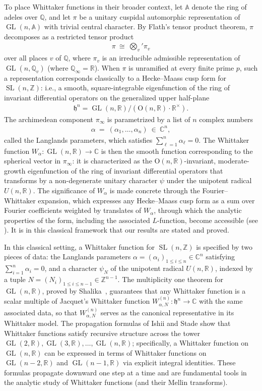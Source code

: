 \documentclass[12pt, reqno, oneside]{amsart}
\theoremstyle{definition}
\numberwithin{equation}{section}
\newcommand{\Z}{\mathbb{Z}}
\newcommand{\R}{\mathbb{R}}
\newcommand{\C}{\mathbb{C}}
\newcommand{\A}{\mathbb{A}}
\newcommand{\Q}{\mathbb{Q}}
\newcommand{\hh}{\mathfrak{h}}
\DeclareMathOperator{\GL}{GL}
\DeclareMathOperator{\SL}{SL}
\begin{document}
To place Whittaker functions in their broader context, let $\A$ denote
the ring of adeles over $\Q$, and let $\pi$ be a unitary cuspidal automorphic
representation of $\GL(n,\A)$ with trivial central character. By
Flath's tensor product theorem, $\pi$ decomposes as a restricted tensor product 
\begin{align*}
\pi \ \cong \ \bigotimes_v' \pi_v
\end{align*}
over all places $v$ of $\Q$,
where $\pi_v$ is an irreducible admissible representation of
$\GL(n,\Q_v)$ (where $\Q_\infty = \R$). When $\pi$ is unramified at every finite prime $p$, such a representation corresponds classically to a Hecke--Maass cusp form for $\SL(n,\Z)$: i.e., a smooth,
square-integrable eigenfunction of the ring of
invariant differential operators on the generalized upper half-plane
\begin{align*}
\hh^n = \GL(n,\R)/(\mathrm{O}(n,\R)\cdot\R^\times).
\end{align*}
The archimedean
component $\pi_\infty$ is parametrized by a list of $n$ complex numbers
\begin{align*}
\alpha \ = \ (\alpha_1, \dots, \alpha_n) \ \in \ \C^n,
\end{align*}
called the Langlands parameters, which satisfies $\sum_{\ell = 1}^n \alpha_\ell = 0$. The Whittaker function $W_\alpha :
\GL(n,\R)\to\C$ is then the smooth function corresponding to the
spherical vector in $\pi_\infty$: it is characterized as the
$\mathrm{O}(n,\R)$-invariant, moderate-growth eigenfunction of the ring of invariant differential operators that transforms by a non-degenerate unitary character $\psi$ under the
unipotent radical $U(n,\R)$. The significance of $W_\alpha$ is made concrete
through the Fourier--Whittaker expansion, which expresses any Hecke--Maass
cusp form as a sum over Fourier coefficients weighted by translates of
$W_\alpha$, through which the analytic properties of the form, including
the associated $L$-function, become accessible (see \cite[Theorem 9.3.11]{Gol06}). It is in this classical
framework that our
results are stated and proved.

In this classical setting, a Whittaker function for $\SL(n,\Z)$ is
specified by two pieces of data: the Langlands parameters $\alpha =
(\alpha_i)_{1\leq i\leq n}\in\C^n$ satisfying $\sum_{i=1}^n\alpha_i=0$, and a character
$\psi_N$ of the unipotent radical $U(n,\R)$, indexed by a tuple
$N=(N_i)_{1\leq i\leq n-1}\in\Z^{n-1}$. The multiplicity one theorem for
$\GL(n,\R)$, proved by Shalika~\cite{Sha74}, guarantees that any
Whittaker function is a scalar multiple of Jacquet's Whittaker function
$W_{\alpha,N}^{(n)}:\hh^n\to\C$ with the same associated data, so that
$W_{\alpha,N}^{(n)}$ serves as the canonical representative in its
Whittaker model. The propagation formulas of Ishii and Stade show that
Whittaker functions satisfy recursive structure across the tower
$\GL(2,\R),\GL(3,\R),\dots, \GL(n,\R)$; specifically, a Whittaker function on
$\GL(n,\R)$ can be expressed in terms of Whittaker functions on
$\GL(n-2,\R)$ and $\GL(n-1,\R)$ via explicit integral identities. These
formulas propagate downward one step at a time and are fundamental tools
in the analytic study of Whittaker functions (and their Mellin transforms).
\end{document}
